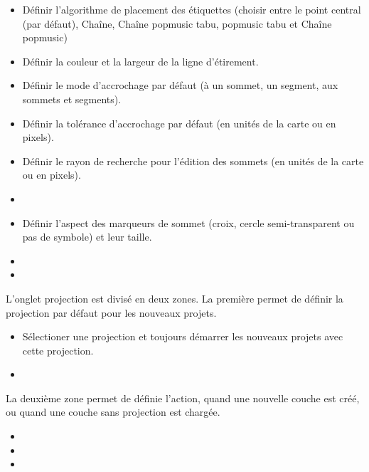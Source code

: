 
\begin{itemize}[label=--]
\item Définir l'algorithme de placement des étiquettes (choisir entre le point central 
(par défaut), Chaîne, Chaîne popmusic tabu, popmusic tabu et Chaîne popmusic)
\end{itemize}


\begin{itemize}[label=--]
\item Définir la couleur et la largeur de la ligne d'étirement.
\item Définir le mode d'accrochage par défaut (à un sommet, un segment, aux sommets et segments).
\item Définir la tolérance d'accrochage par défaut (en unités de la carte ou en pixels). 
\item Définir le rayon de recherche pour l'édition des sommets (en unités de la carte ou en pixels).
\item {}
\item Définir l'aspect des marqueurs de sommet (croix, cercle semi-transparent ou pas de symbole) et leur taille.
\item {}
\item {}
\end{itemize}


L'onglet projection est divisé en deux zones. La première permet de définir la 
projection par défaut pour les nouveaux projets.

\begin{itemize}
\item Sélectioner une projection et toujours démarrer les nouveaux projets avec cette projection.
\item {}
\end{itemize}

La deuxième zone permet de définie l'action, quand une nouvelle couche est créé, ou quand 
une couche sans projection est chargée.

\begin{itemize}[label=--]
\item {}
\item {}
\item {}
\end{itemize}

